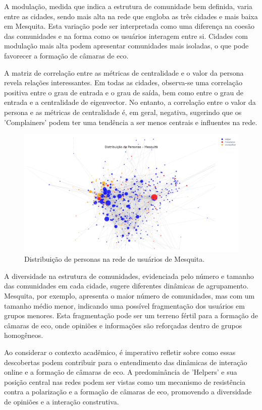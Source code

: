 A modulação, medida que indica a estrutura de comunidade bem definida, varia entre as cidades, sendo mais alta na rede que engloba as três cidades e mais baixa em Mesquita. Esta variação pode ser interpretada como uma diferença na coesão das comunidades e na forma como os usuários interagem entre si. Cidades com modulação mais alta podem apresentar comunidades mais isoladas, o que pode favorecer a formação de câmaras de eco.

A matriz de correlação entre as métricas de centralidade e o valor da persona revela relações interessantes. Em todas as cidades, observa-se uma correlação positiva entre o grau de entrada e o grau de saída, bem como entre o grau de entrada e a centralidade de eigenvector. No entanto, a correlação entre o valor da persona e as métricas de centralidade é, em geral, negativa, sugerindo que os 'Complainers' podem ter uma tendência a ser menos centrais e influentes na rede.

\begin{figure}[h]
    \centering
    \includegraphics[width=1\textwidth]{images/network_personas_mesquita.png}
    \caption{Distribuição de personas na rede de usuários de Mesquita.}
    \label{fig:network_personas_mesquita}
\end{figure}

A diversidade na estrutura de comunidades, evidenciada pelo número e tamanho das comunidades em cada cidade, sugere diferentes dinâmicas de agrupamento. Mesquita, por exemplo, apresenta o maior número de comunidades, mas com um tamanho médio menor, indicando uma possível fragmentação dos usuários em grupos menores. Esta fragmentação pode ser um terreno fértil para a formação de câmaras de eco, onde opiniões e informações são reforçadas dentro de grupos homogêneos.

Ao considerar o contexto acadêmico, é imperativo refletir sobre como essas descobertas podem contribuir para o entendimento das dinâmicas de interação online e a formação de câmaras de eco. A predominância de 'Helpers' e sua posição central nas redes podem ser vistas como um mecanismo de resistência contra a polarização e a formação de câmaras de eco, promovendo a diversidade de opiniões e a interação construtiva.

